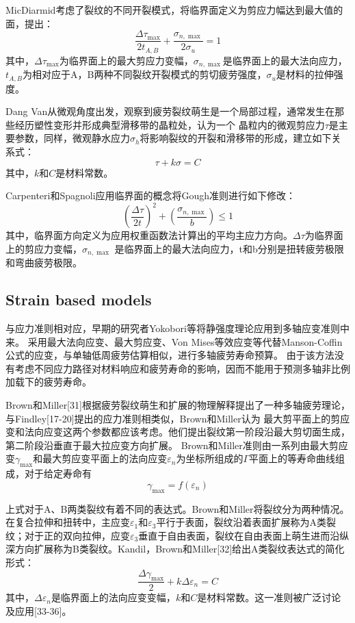 MicDiarmid\cite{mcdiarmid1991general}考虑了裂纹的不同开裂模式，将临界面定义为剪应力幅达到最大值的面，提出：
\[\frac{{\Delta {\tau _{\max }}}}{{2{t_{A,B}}}} + \frac{{{\sigma _{n,\max }}}}{{2{\sigma _u}}} = 1\]
其中，${\Delta {\tau _{\max }}}$为临界面上的最大剪应力变幅，${\sigma _{n,\max }}$是临界面上的最大法向应力，${t_{A,B}}$为相对应于A，B两种不同裂纹开裂模式的剪切疲劳强度，${\sigma _u}$是材料的拉伸强度。

Dang Van\cite{van1986criterion}\cite{van1999introduction}从微观角度出发，观察到疲劳裂纹萌生是一个局部过程，通常发生在那些经历塑性变形并形成典型滑移带的晶粒处，认为一个
晶粒内的微观剪应力$\tau$是主要参数，同样，微观静水应力$\sigma_h$将影响裂纹的开裂和滑移带的形成，建立如下关系式：
\[\tau  + k\sigma  = C\]
其中，$k$和$C$是材料常数。

Carpenteri和Spagnoli\cite{carpinteri2001multiaxial}应用临界面的概念将Gough准则进行如下修改：
\[{\left( {\frac{{\Delta \tau }}{{2t}}} \right)^2} + \left( {\frac{{{\sigma _{n,\max }}}}{b}} \right) \le 1\]
其中，临界面方向定义为应用权重函数法计算出的平均主应力方向。${\Delta \tau }$为临界面上的剪应力变幅，${\sigma _{n,\max }}$
是临界面上的最大法向应力，t和b分别是扭转疲劳极限和弯曲疲劳极限。


\subsection{Strain based models}
与应力准则相对应，早期的研究者Yokobori等将静强度理论应用到多轴应变准则中来。
采用最大法向应变、最大剪应变、Von Mises等效应变等代替Manson-Coffin公式的应变，与单轴低周疲劳估算相似，进行多轴疲劳寿命预算。
由于该方法没有考虑不同应力路径对材料响应和疲劳寿命的影响，因而不能用于预测多轴非比例加载下的疲劳寿命。

Brown和Miller[31]根据疲劳裂纹萌生和扩展的物理解释提出了一种多轴疲劳理论，与Findley[17-20]提出的应力准则相类似，Brown和Miller认为
最大剪平面上的剪应变和法向应变这两个参数都应该考虑。他们提出裂纹第一阶段沿最大剪切面生成，第二阶段沿垂直于最大拉应变方向扩展。
Brown和Miller准则由一系列由最大剪应变${\gamma _{\max }}$和最大剪应变平面上的法向应变${\varepsilon _n}$为坐标所组成的$\Gamma$平面上的等寿命曲线组成，对于给定寿命有
\[{\gamma _{\max }} = f\left( {{\varepsilon _n}} \right)\]

上式对于A、B两类裂纹有着不同的表达式。Brown和Miller将裂纹分为两种情况。在复合拉伸和扭转中，主应变${\varepsilon _1}$和${\varepsilon _3}$平行于表面，裂纹沿着表面扩展称为A类裂纹；对于正的双向拉伸，应变${\varepsilon _3}$垂直于自由表面，裂纹在自由表面上萌生进而沿纵深方向扩展称为B类裂纹。Kandil，Brown和Miller[32]给出A类裂纹表达式的简化形式：
\[\frac{{\Delta {\gamma _{\max }}}}{2} + k\Delta {\varepsilon _n} = C\]
其中，$\Delta {\varepsilon _n}$是临界面上的法向应变变幅，$k$和$C$是材料常数。这一准则被广泛讨论及应用[33-36]。

